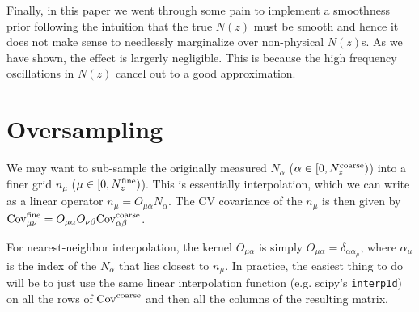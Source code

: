\documentclass[a4paper,11pt]{article}
\begin{document}
Finally, in this paper we went through some pain to implement a smoothness prior following the intuition that the true $N(z)$ must be smooth and hence it does not make sense to needlessly  marginalize over non-physical $N(z)$s. As we have shown, the effect is largerly negligible. This is because the high frequency oscillations in $N(z)$ cancel out to a good approximation.












\appendix
\section{Oversampling}
We may want to sub-sample the originally measured $N_{\alpha}$ ($\alpha\in[0,N_z^{\rm coarse})$) into a finer grid $n_{\mu}$ ($\mu\in[0,N_z^{\rm fine})$). This is essentially interpolation, which we can write as a linear operator $n_\mu = O_{\mu\alpha}N_{\alpha}$. The CV covariance of the $n_\mu$ is then given by ${\rm Cov}^{\rm fine}_{\mu\nu}=O_{\mu\alpha}O_{\nu\beta}{\rm Cov}^{\rm coarse}_{\alpha\beta}$.

For nearest-neighbor interpolation, the kernel $O_{\mu\alpha}$ is simply $O_{\mu\alpha}=\delta_{\alpha\alpha_\mu}$, where $\alpha_\mu$ is the index of the $N_\alpha$ that lies closest to $n_\mu$. In practice, the easiest thing to do will be to just use the same linear interpolation function (e.g. scipy's {\tt interp1d}) on all the rows of ${\rm Cov}^{\rm coarse}$ and then all the columns of the resulting matrix.



\end{document}
